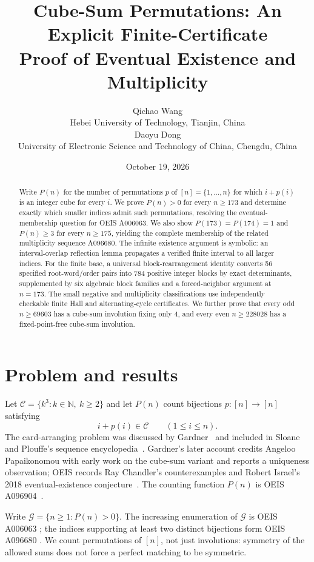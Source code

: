 \documentclass[9pt]{extarticle}
\title{Cube-Sum Permutations: An Explicit Finite-Certificate\\Proof of Eventual Existence and Multiplicity}
\author{Qichao Wang\\{\small Hebei University of Technology, Tianjin, China}\\[0.4em]Daoyu Dong\\{\small University of Electronic Science and Technology of China, Chengdu, China}}
\date{October 19, 2026}
\newcommand{\C}{\mathcal C}
\newcommand{\G}{\mathcal G}
\newcommand{\N}{\mathbb N}
\begin{document}
\maketitle
\begin{abstract}
Write $P(n)$ for the number of permutations $p$ of $[n]=\{1,\dots,n\}$ for which $i+p(i)$ is an integer cube for every $i$. We prove $P(n)>0$ for every $n\ge173$ and determine exactly which smaller indices admit such permutations, resolving the eventual-membership question for OEIS A006063. We also show $P(173)=P(174)=1$ and $P(n)\ge3$ for every $n\ge175$, yielding the complete membership of the related multiplicity sequence A096680. The infinite existence argument is symbolic: an interval-overlap reflection lemma propagates a verified finite interval to all larger indices. For the finite base, a universal block-rearrangement identity converts 56 specified root-word/order pairs into 784 positive integer blocks by exact determinants, supplemented by six algebraic block families and a forced-neighbor argument at $n=173$. The small negative and multiplicity classifications use independently checkable finite Hall and alternating-cycle certificates. We further prove that every odd $n\ge69603$ has a cube-sum involution fixing only $4$, and every even $n\ge228028$ has a fixed-point-free cube-sum involution.
\end{abstract}

\section{Problem and results}\label{sec:intro}
Let $\C=\{k^3:k\in\N,\ k\ge2\}$ and let $P(n)$ count bijections $p:[n]\to[n]$ satisfying
\begin{equation}\label{eq:admissible} i+p(i)\in\C\qquad(1\le i\le n).\end{equation}
The card-arranging problem was discussed by Gardner~\cite{gardner1975,gardner1988} and included in Sloane and Plouffe's sequence encyclopedia~\cite{sloaneplouffe1995}. Gardner's later account credits Angeloo Papaikonomou with early work on the cube-sum variant and reports a uniqueness observation; OEIS records Ray Chandler's counterexamples and Robert Israel's 2018 eventual-existence conjecture~\cite{gardner1988,oeis-a006063,oeis-a096680}. The counting function $P(n)$ is OEIS A096904~\cite{oeis-a096904}.

Write $\G=\{n\ge1:P(n)>0\}$. The increasing enumeration of $\G$ is OEIS A006063 \cite{oeis-a006063}; the indices supporting at least two distinct bijections form OEIS A096680 \cite{oeis-a096680}. We count permutations of $[n]$, not just involutions: symmetry of the allowed sums does not force a perfect matching to be symmetric.
\end{document}

